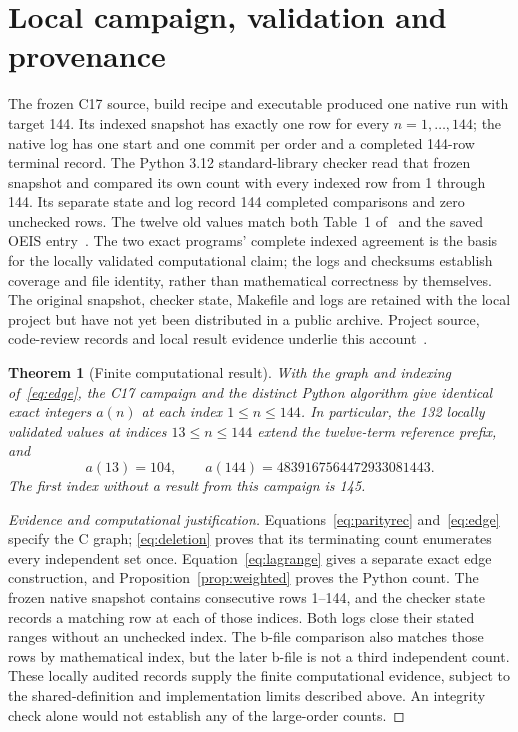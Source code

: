 \documentclass[11pt,a4paper]{article}
\newtheorem{theorem}{Theorem}[section]
\begin{document}
\section{Local campaign, validation and provenance}\label{sec:results}
The frozen C17 source, build recipe and executable produced one native run
with target 144.  Its indexed snapshot has exactly one row for every
$n=1,\ldots,144$; the native log has one start and one commit per order and a
completed 144-row terminal record.  The Python 3.12 standard-library checker
read that frozen snapshot and compared its own count with every indexed row
from 1 through 144.  Its separate state and log record 144 completed
comparisons and zero unchecked rows.  The twelve old values match both
Table~1 of~\cite{counting} and the saved OEIS entry~\cite{oeis}.
The two exact programs' complete indexed agreement is the basis for the
locally validated computational claim; the logs and checksums establish
coverage and file identity, rather than mathematical correctness by
themselves.  The original snapshot, checker state, Makefile and logs are
retained with the local project but have not yet been distributed in a
public archive.  Project source, code-review records and local result evidence
underlie this account~\cite{project}.

\begin{theorem}[Finite computational result]\label{thm:finite}
With the graph and indexing of~\eqref{eq:edge}, the C17 campaign and the
distinct Python algorithm give identical exact integers $a(n)$ at each
index $1\leq n\leq144$.  In particular, the 132 locally validated values
at indices $13\leq n\leq144$ extend the twelve-term reference prefix, and
\[
 a(13)=104,\qquad a(144)=4839167564472933081443.
\]
The first index without a result from this campaign is 145.
\end{theorem}
\begin{proof}[Evidence and computational justification]
Equations~\eqref{eq:parityrec} and~\eqref{eq:edge} specify the C graph;
\eqref{eq:deletion} proves that its terminating count enumerates every
independent set once.  Equation~\eqref{eq:lagrange} gives a separate exact
edge construction, and Proposition~\ref{prop:weighted} proves the Python
count.  The frozen native snapshot contains consecutive rows 1--144, and the
checker state records a matching row at each of those indices.  Both logs
close their stated ranges without an unchecked index.  The b-file comparison
also matches those rows by mathematical index, but the later b-file is not a
third independent count.  These locally audited records supply the
finite computational evidence, subject to the shared-definition and
implementation limits described above.  An integrity check alone would not
establish any of the large-order counts.
\end{proof}
\end{document}
